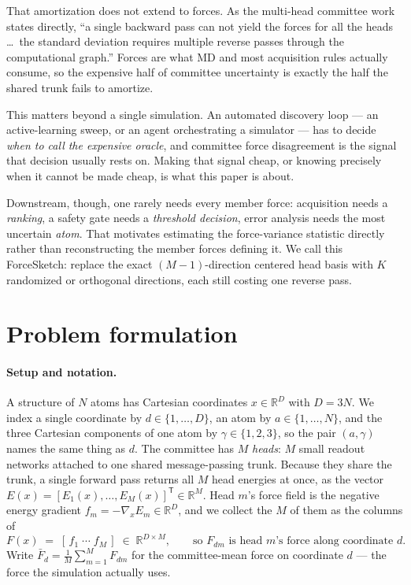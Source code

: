 \documentclass{article}
\begin{document}
That amortization does not extend to forces. As the multi-head committee work states directly, ``a
single backward pass can not yield the forces for all the heads \ldots\ the standard deviation
requires multiple reverse passes through the computational graph.'' Forces are what MD and most
acquisition rules actually consume, so the expensive half of committee uncertainty is exactly the
half the shared trunk fails to amortize.

This matters beyond a single simulation. An automated discovery loop --- an active-learning sweep,
or an agent orchestrating a simulator --- has to decide \emph{when to call the expensive oracle},
and committee force disagreement is the signal that decision usually rests on. Making that signal
cheap, or knowing precisely when it cannot be made cheap, is what this paper is about.

Downstream, though, one rarely needs every member force: acquisition needs a \emph{ranking}, a safety
gate needs a \emph{threshold decision}, error analysis needs the most uncertain \emph{atom}. That
motivates estimating the force-variance statistic directly rather than reconstructing the member
forces defining it. We call this ForceSketch: replace the exact $(M{-}1)$-direction centered head
basis with $K$ randomized or orthogonal directions, each still costing one reverse pass.

\section{Problem formulation}
\label{sec:problem}
\paragraph{Setup and notation.}
A structure of $N$ atoms has Cartesian coordinates $x\in\mathbb{R}^{D}$ with $D=3N$. We index a
single coordinate by $d\in\{1,\dots,D\}$, an atom by $a\in\{1,\dots,N\}$, and the three Cartesian
components of one atom by $\gamma\in\{1,2,3\}$, so the pair $(a,\gamma)$ names the same thing as $d$.
The committee has $M$ \emph{heads}: $M$ small readout networks attached to one shared
message-passing trunk. Because they share the trunk, a single forward pass returns all $M$ head
energies at once, as the vector
$E(x)=[E_1(x),\dots,E_M(x)]^{\mathsf T}\in\mathbb{R}^{M}$. Head $m$'s force field is the negative
energy gradient $f_m=-\nabla_x E_m\in\mathbb{R}^{D}$, and we collect the $M$ of them as the columns
of
\begin{equation*}
F(x)\;=\;[\,f_1\;\cdots\;f_M\,]\;\in\;\mathbb{R}^{D\times M},
\qquad\text{so } F_{dm} \text{ is head } m\text{'s force along coordinate } d .
\end{equation*}
Write $\bar F_d=\tfrac1M\sum_{m=1}^{M}F_{dm}$ for the committee-mean force on coordinate $d$ --- the
force the simulation actually uses.
\end{document}
